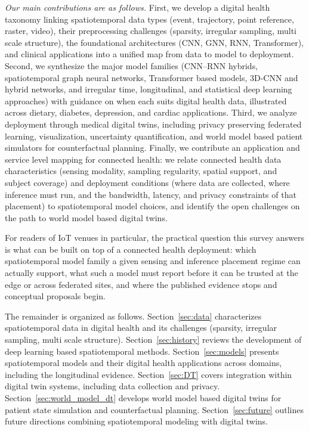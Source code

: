 \documentclass[journal]{IEEEtran}
\begin{document}
\emph{Our main contributions are as follows.} First, we develop a digital health taxonomy linking spatiotemporal data types (event, trajectory, point reference, raster, video), their preprocessing challenges (sparsity, irregular sampling, multi scale structure), the foundational architectures (CNN, GNN, RNN, Transformer), and clinical applications into a unified map from data to model to deployment. Second, we synthesize the major model families (CNN--RNN hybrids, spatiotemporal graph neural networks, Transformer based models, 3D-CNN and hybrid networks, and irregular time, longitudinal, and statistical deep learning approaches) with guidance on when each suits digital health data, illustrated across dietary, diabetes, depression, and cardiac applications. Third, we analyze deployment through medical digital twins, including privacy preserving federated learning, visualization, uncertainty quantification, and world model based patient simulators for counterfactual planning. Finally, we contribute an application and service level mapping for connected health: we relate connected health data characteristics (sensing modality, sampling regularity, spatial support, and subject coverage) and deployment conditions (where data are collected, where inference must run, and the bandwidth, latency, and privacy constraints of that placement) to spatiotemporal model choices, and identify the open challenges on the path to world model based digital twins.



For readers of IoT venues in particular, the practical question this survey answers is what can be built on top of a connected health deployment: which spatiotemporal model family a given sensing and inference placement regime can actually support, what such a model must report before it can be trusted at the edge or across federated sites, and where the published evidence stops and conceptual proposals begin.

The remainder is organized as follows. Section~\ref{sec:data} characterizes spatiotemporal data in digital health and its challenges (sparsity, irregular sampling, multi scale structure). Section~\ref{sec:history} reviews the development of deep learning based spatiotemporal methods. Section~\ref{sec:models} presents spatiotemporal models and their digital health applications across domains, including the longitudinal evidence. Section~\ref{sec:DT} covers integration within digital twin systems, including data collection and privacy. Section~\ref{sec:world_model_dt} develops world model based digital twins for patient state simulation and counterfactual planning. Section~\ref{sec:future} outlines future directions combining spatiotemporal modeling with digital twins.
\end{document}
